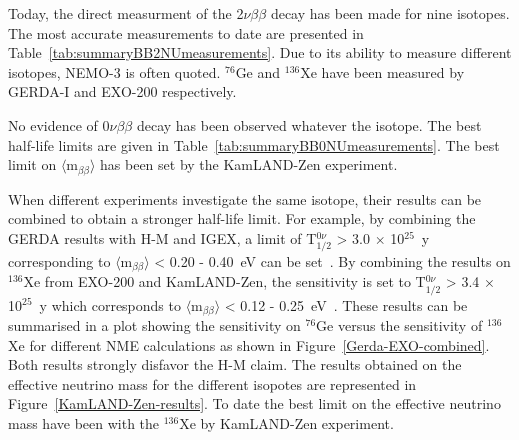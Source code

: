 \documentclass[main.tex]{subfiles}
\begin{document}
\NI Today, the direct measurment of the 2$\nu\beta\beta$ decay has been made for nine isotopes. The most accurate measurements to date are presented in Table~\ref{tab:summaryBB2NUmeasurements}. Due to its ability to measure different isotopes, NEMO-3 is often quoted. $^{\text{76}}$Ge and $^{\text{136}}$Xe have been measured by GERDA-I and EXO-200 respectively.


\bigskip


\NI No evidence of 0$\nu\beta\beta$ decay has been observed whatever the isotope. The best half-life limits are given in Table~\ref{tab:summaryBB0NUmeasurements}. The best limit on $\langle \text{m}_{\beta\beta} \rangle$ has been set by the KamLAND-Zen experiment.


\bigskip


\NI When different experiments investigate the same isotope, their results can be combined to obtain a stronger half-life limit. For example, by combining the GERDA results with H-M and IGEX, a limit of T$_{\text{1/2}}^{\text{0}\nu}$ > 3.0 $\times$ 10$^{\text{25}}$~y corresponding to $\langle \text{m}_{\beta\beta} \rangle$ < 0.20 - 0.40~eV can be set~\cite{GERDA}.  By combining the results on $^{\text{136}}$Xe from EXO-200 and KamLAND-Zen, the sensitivity is set to T$_{\text{1/2}}^{\text{0}\nu}$ > 3.4 $\times$ 10$^{\text{25}}$~y which corresponds to $\langle \text{m}_{\beta\beta} \rangle$ < 0.12 - 0.25~eV~\cite{KamLAND-Zen}. These results can be summarised in a plot showing the sensitivity on $^{\text{76}}$Ge versus the sensitivity of $^{\text{136}}$Xe for different NME calculations as shown in Figure~\ref{Gerda-EXO-combined}. Both results strongly disfavor the H-M claim. The results obtained on the effective neutrino mass for the different isopotes are represented in Figure~\ref{KamLAND-Zen-results}. To date the best limit on the effective neutrino mass have been with the $^{\text{136}}$Xe by KamLAND-Zen experiment.
\end{document}
